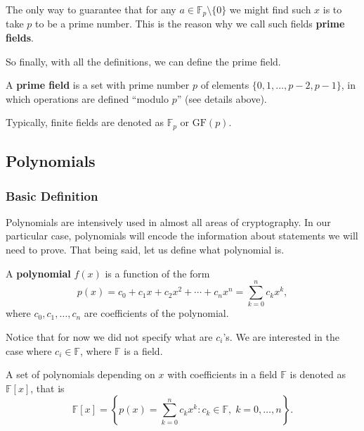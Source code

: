 \documentclass[../lecture-notes.tex]{subfiles}
\begin{document}
The only way to guarantee that for any $a \in \mathbb{F}_p \setminus \{0\}$ we might find such $x$ is to take $p$ to be a prime number. This is the reason why we call such fields \textbf{prime fields}.

So finally, with all the definitions, we can define the prime field.

\begin{definition}
    A \textbf{prime field} is a set with prime number $p$ of elements $\{0,1,\dots,p-2,p-1\}$, in which operations are defined ``modulo $p$'' (see details above). 

    Typically, finite fields are denoted as $\mathbb{F}_p$ or $\text{GF}(p)$.
\end{definition}


\subsection{Polynomials}

\subsubsection{Basic Definition}

Polynomials are intensively used in almost all areas of cryptography. In our particular case, polynomials will encode the information about
statements we will need to prove. That being said, let us define what polynomial is.

\begin{definition}
    A \textbf{polynomial} $f(x)$ is a function of the form
    \begin{equation}
        p(x) = c_0 + c_1 x + c_2 x^2 + \cdots + c_n x^n = \sum_{k=0}^{n} c_k x^k,
    \end{equation}
    where $c_0, c_1, \dots, c_n$ are coefficients of the polynomial.
\end{definition}

Notice that for now we did not specify what are $c_i$'s. We are interested in the case where $c_i \in \mathbb{F}$, where $\mathbb{F}$ is a field. 

\begin{definition}
    A set of polynomials depending on $x$ with coefficients in a field $\mathbb{F}$ is denoted as $\mathbb{F}[x]$, that is
    \begin{equation}
        \mathbb{F}[x] = \left\{p(x) = \sum_{k=0}^{n} c_k x^k: c_k \in \mathbb{F}, \; k = 0,\dots,n\right\}.
    \end{equation}
\end{definition}
\end{document}
